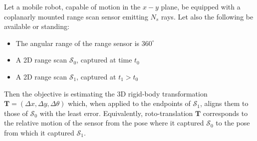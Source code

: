 \begin{problem}
  \label{prob:the_problem}
  Let a mobile robot, capable of motion in the $x-y$ plane, be equipped with a
  coplanarly mounted range scan sensor emitting $N_s$ rays. Let
  also the following be available or standing:
  \begin{itemize}
    \item The angular range of the range sensor is $360^\circ$
    \item A 2D range scan $\mathcal{S}_0$, captured at time $t_0$
    \item A 2D range scan $\mathcal{S}_1$, captured at $t_1 > t_0$
  \end{itemize}
\end{problem}
Then the objective is estimating the 3D rigid-body transformation
$\bm{T} = (\Delta x, \Delta y, \Delta \theta)$ which, when applied to the
endpoints of $\mathcal{S}_1$, aligns them to those of $\mathcal{S}_0$ with the
least error. Equivalently, roto-translation $\bm{T}$ corresponds to the
relative motion of the sensor from the pose where it captured $\mathcal{S}_0$
to the pose from which it captured $\mathcal{S}_1$.
